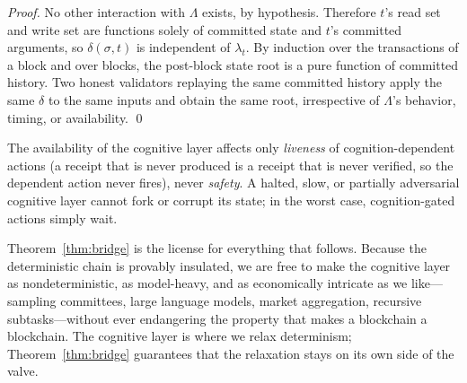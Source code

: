 \begin{proof}
No other interaction with $\Lambda$ exists, by hypothesis. Therefore $t$'s read set and write set are functions solely of committed \CChain{} state and $t$'s committed arguments, so $\delta(\sigma, t)$ is independent of $\lambda_t$. By induction over the transactions of a block and over blocks, the post-block state root is a pure function of committed history. Two honest validators replaying the same committed history apply the same $\delta$ to the same inputs and obtain the same root, irrespective of $\Lambda$'s behavior, timing, or availability. \qed
\end{proof}

\begin{corollary}
\label{cor:liveness}
The availability of the cognitive layer affects only \CChain{} \emph{liveness} of cognition-dependent actions (a receipt that is never produced is a receipt that is never verified, so the dependent action never fires), never \CChain{} \emph{safety}. A halted, slow, or partially adversarial cognitive layer cannot fork \CChain{} or corrupt its state; in the worst case, cognition-gated actions simply wait.
\end{corollary}

Theorem~\ref{thm:bridge} is the license for everything that follows. Because the deterministic chain is provably insulated, we are free to make the cognitive layer as nondeterministic, as model-heavy, and as economically intricate as we like---sampling committees, large language models, market aggregation, recursive subtasks---without ever endangering the property that makes a blockchain a blockchain. The cognitive layer is where we relax determinism; Theorem~\ref{thm:bridge} guarantees that the relaxation stays on its own side of the valve.

